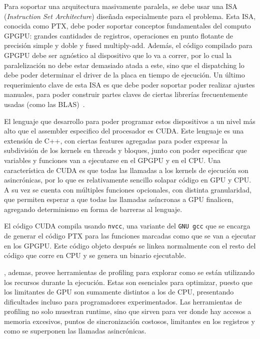 Para soportar una arquitectura masivamente paralela, se debe usar una ISA
(\textit{Instruction Set Architecture}) dise\~nada especialmente para el problema. Esta ISA, conocida como PTX,
debe poder soportar conceptos fundamentales del computo GPGPU: grandes cantidades de registros,
operaciones en punto flotante de precisi\'on simple y doble y fused multiply-add. Adem\'as,
el c\'odigo compilado para GPGPU debe ser agn\'ostico al dispositivo que lo va a correr, por
lo cual la paralelizaci\'on no debe estar demasiado atada a este, sino que el dispatching
lo debe poder determinar el driver de la placa en tiempo de ejecuci\'on.  Un \'ultimo
requerimiento clave de esta ISA es que debe poder soportar poder realizar ajustes manuales,
para poder construir partes claves de ciertas librer\'ias frecuentemente usadas (como las BLAS)~\cite{NvidiaFermi}.

El lenguaje que desarrollo \nvidia para poder programar estos dispositivos a un nivel m\'as alto
que el assembler especifico del procesador es CUDA. Este lenguaje es una extensi\'on de C++, con ciertas
features agregadas para poder expresar la subdivisi\'on de los kernels en threads y bloques, junto
con poder especificar que variables y funciones van a ejecutarse en el GPGPU y en el CPU. Una caracter\'istica
de CUDA es que todas las llamadas a los kernels de ejecuci\'on son asincr\'onicas, por lo que es relativamente
sencillo solapar c\'odigo en GPU y CPU. A su vez se cuenta con m\'ultiples funciones opcionales, con distinta
granularidad, que permiten esperar a que todas las llamadas as\'incronas a GPU finalicen, agregando determinismo
en forma de barreras al lenguaje.

El c\'odigo CUDA compila usando \texttt{nvcc}, una variante del \texttt{GNU gcc} que se
encarga de generar el c\'odigo PTX para las funciones marcadas como que se van a ejecutar
en los GPGPU. Este c\'odigo objeto despu\'es se linkea normalmente con el resto del c\'odigo que corre en CPU
y se genera un binario ejecutable.

\nvidia, ademas, provee herramientas de profiling para explorar como se est\'an utilizando los
recursos durante la ejecuci\'on. Estas son esenciales para optimizar, puesto que los limitantes
de GPU son sumamente distintos a los de CPU, presentando dificultades incluso para programadores
experimentados. Las herramientas de profiling no solo muestran runtime, sino que sirven para
ver donde hay accesos a memoria excesivos, puntos de sincronizaci\'on costosos, limitantes
en los registros y como se superponen las llamadas asincr\'onicas.

